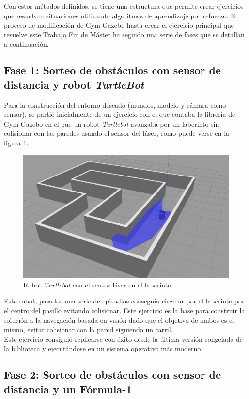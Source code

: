 Con estos métodos definidos, se tiene una estructura que permite crear ejercicios que resuelvan situaciones utilizando algoritmos de aprendizaje por refuerzo. El proceso de modificación de Gym-Gazebo hasta crear el ejercicio principal que resuelve este Trabajo Fin de Máster ha seguido una serie de fases que se detallan a continuación.

\subsection{Fase 1: Sorteo de obstáculos con sensor de distancia y robot \textit{TurtleBot}}

Para la construcción del entorno deseado (mundos, modelo y cámara como sensor), se partió inicialmente de un ejercicio con el que contaba la librería de Gym-Gazebo en el que un robot \textit{Turtlebot} avanzaba por un laberinto sin colisionar con las paredes usando el sensor del láser, como puede verse en la figura \ref{fig:turtlebot-laser}.

\begin{figure}[!ht]
    \centering \includegraphics[width=0.4\columnwidth]{./figures/chapter_4/turtlebot_laser.png}
    \caption{Robot \textit{Turtlebot} con el sensor láser en el laberinto.\label{fig:turtlebot-laser}}
\end{figure}

Este robot, pasados una serie de episodios conseguía circular por el laberinto por el centro del pasillo evitando colisionar. Este ejercicio es la base para construir la solución a la navegación basada en visión dado que el objetivo de ambos es el mismo, evitar colisionar con la pared siguiendo un carril.\\

Este ejercicio consiguió replicarse con éxito desde la última versión congelada de la biblioteca y ejecutándose en un sistema operativo más moderno.

\subsection{Fase 2: Sorteo de obstáculos con sensor de distancia y un Fórmula-1}


